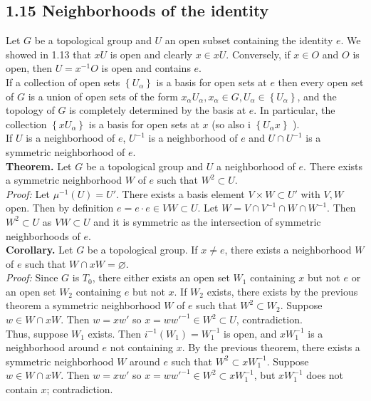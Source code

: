 \documentclass[a4paper]{article}
\theoremstyle{plain}%
\theoremstyle{definition}
\theoremstyle{remark}
\begin{document}
\subsection*{1.15 \quad Neighborhoods of the identity}
Let $G$ be a topological group and $U$ an open subset containing the identity
$e$. We showed in 1.13 that $xU$ is open and clearly $x \in xU$. Conversely, if
$x \in O$ and $O$ is open, then  $U = x^{-1}O$ is open and contains $e$.\\
\linebreak
If a collection of open sets $\left\{ U_{\alpha} \right\} $ is a basis for open
sets at $e$ then every open set of $G$ is a union of open sets of the form
$x_{\alpha} U_{\alpha}, x_{\alpha} \in G, U_{\alpha} \in \left\{ U_{\alpha}
\right\} $, and the topology of $G$ is completely determined by the basis at
$e$. In particular, the collection $\left\{ x U_{\alpha} \right\} $ is a basis
for open sets at $x$ (so also i  $\left\{ U_{\alpha}x \right\} $ ).\\
If $U$ is a neighborhood of $e$, $U^{-1}$ is a neighborhood of $e$ and
$U \cap U^{-1}$ is a symmetric neighborhood of $e$.\\
\linebreak
\textbf{Theorem.} Let $G$ be a topological group and $U$ a neighborhood of $e$.
There exists a symmetric neighborhood $W$ of $e$ such that
$W^2 \subset U$.\\
\linebreak
\textit{Proof:}  Let $\mu^{-1}(U) = U'$. There exists a basis element
$V \times W \subset U'$ with $V,W$ open. Then by definition
$e = e\cdot e \in  VW \subset U$. Let
$W = V \cap V^{-1} \cap W \cap W^{-1}$. Then
$W^2 \subset U$ as $VW \subset U$ and it is symmetric as the intersection of 
symmetric neighborhoods of $e$.\\
\linebreak
\textbf{Corollary.} Let $G$ be a topological group. If $x \neq e$, there
exists a neighborhood $W$ of $e$ such that $W \cap xW = \varnothing$.\\
\linebreak
\textit{Proof:} Since $G$ is $T_0$, there either exists an open set $W_1$
containing $x$ but not $e$ or an open set $W_2$ containing $e$ but not $x$. If
$W_2$ exists, there exists by the previous theorem a symmetric neighborhood $W$
of $e$ such that $W^2 \subset W_2$. Suppose $w \in W \cap xW$. Then
$w = xw'$ so $x = w w'^{-1} \in W^2 \subset U$, contradiction.\\
\linebreak
Thus, suppose $W_1$ exists. Then $i^{-1}\left( W_1 \right) = W_1^{-1}$ is open,
and $xW_1^{-1}$ is a neighborhood around $e$ not containing $x$. By the
previous theorem, there exists a symmetric neighborhood $W$ around $e$ such that
$W^2 \subset x W_1^{-1}$. Suppose $w \in W \cap xW$. Then
$w = xw'$ so $x = w w'^{-1} \in W^2 \subset x W_1^{-1}$, but
$x W_1^{-1}$ does not contain $x$; contradiction.
\end{document}
